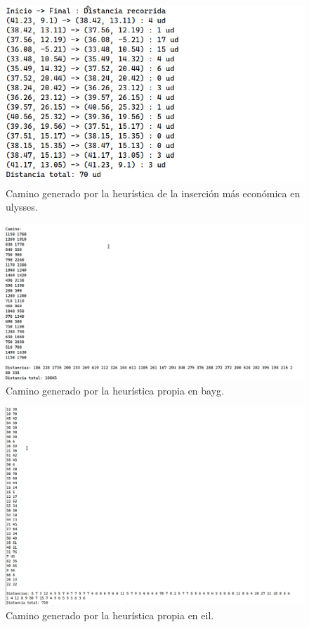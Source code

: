 \begin{figure}[H]
  \centering
  \includegraphics[scale=0.5]{img/dist-insercion-ulysses.png}
  \caption{Camino generado por la heurística de la inserción más económica en ulysses.}
\end{figure}

\begin{figure}[H]
  \centering
  \includegraphics[scale=0.5]{img/dist-kr-bayg.png}
  \caption{Camino generado por la heurística propia en bayg.}
\end{figure}

\begin{figure}[H]
  \centering
  \includegraphics[scale=0.5]{img/dist-kr-eil.png}
  \caption{Camino generado por la heurística propia en eil.}
\end{figure}

